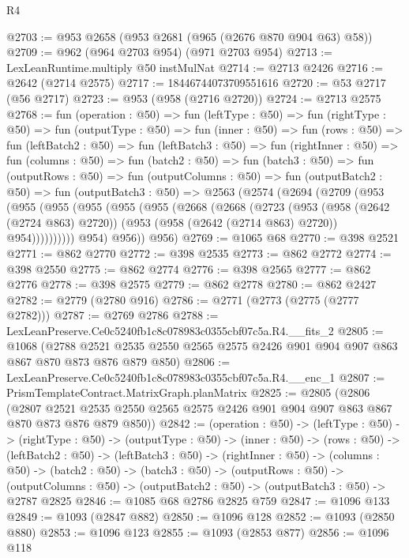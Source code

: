 \begin{lexlean}{R4}
\begin{coremodule}
@2703 := @953 @2658 (@953 @2681 (@965 (@2676 @870 @904 @63) @58))
@2709 := @962 (@964 @2703 @954) (@971 @2703 @954)
@2713 := LexLeanRuntime.multiply @50 instMulNat
@2714 := @2713 @2426
@2716 := @2642 (@2714 @2575)
@2717 := 18446744073709551616
@2720 := @53 @2717 (@56 @2717)
@2723 := @953 (@958 (@2716 @2720))
@2724 := @2713 @2575
@2768 := fun (operation : @50) =>
  fun (leftType : @50) =>
  fun (rightType : @50) =>
  fun (outputType : @50) =>
  fun (inner : @50) =>
  fun (rows : @50) =>
  fun (leftBatch2 : @50) =>
  fun (leftBatch3 : @50) =>
  fun (rightInner : @50) =>
  fun (columns : @50) =>
  fun (batch2 : @50) =>
  fun (batch3 : @50) =>
  fun (outputRows : @50) =>
  fun (outputColumns : @50) =>
  fun (outputBatch2 : @50) =>
  fun (outputBatch3 : @50) =>
  @2563
    (@2574
      (@2694
        (@2709
          (@953
            (@955
              (@955
                (@955
                  (@955
                    (@955
                      (@2668
                        (@2668
                          (@2723
                            (@953
                              (@958 (@2642 (@2724 @863) @2720))
                              (@953 (@958 (@2642 (@2714 @863) @2720)) @954))))))))))
            @954)
          @956))
      @956)
@2769 := @1065 @68
@2770 := @398 @2521
@2771 := @862 @2770
@2772 := @398 @2535
@2773 := @862 @2772
@2774 := @398 @2550
@2775 := @862 @2774
@2776 := @398 @2565
@2777 := @862 @2776
@2778 := @398 @2575
@2779 := @862 @2778
@2780 := @862 @2427
@2782 := @2779 (@2780 @916)
@2786 := @2771 (@2773 (@2775 (@2777 @2782)))
@2787 := @2769 @2786
@2788 := LexLeanPreserve.Ce0c5240fb1c8c078983c0355cbf07c5a.R4.__fits_2
@2805 := @1068
    (@2788 @2521 @2535 @2550 @2565 @2575 @2426 @901 @904 @907 @863 @867 @870 @873 @876 @879 @850)
@2806 := LexLeanPreserve.Ce0c5240fb1c8c078983c0355cbf07c5a.R4.__enc_1
@2807 := PrismTemplateContract.MatrixGraph.planMatrix
@2825 := @2805
    (@2806
      (@2807 @2521 @2535 @2550 @2565 @2575 @2426 @901 @904 @907 @863 @867 @870 @873 @876 @879 @850))
@2842 := (operation : @50) ->
  (leftType : @50) ->
  (rightType : @50) ->
  (outputType : @50) ->
  (inner : @50) ->
  (rows : @50) ->
  (leftBatch2 : @50) ->
  (leftBatch3 : @50) ->
  (rightInner : @50) ->
  (columns : @50) ->
  (batch2 : @50) ->
  (batch3 : @50) ->
  (outputRows : @50) ->
  (outputColumns : @50) -> (outputBatch2 : @50) -> (outputBatch3 : @50) -> @2787 @2825
@2846 := @1085 @68 @2786 @2825 @759
@2847 := @1096 @133
@2849 := @1093 (@2847 @882)
@2850 := @1096 @128
@2852 := @1093 (@2850 @880)
@2853 := @1096 @123
@2855 := @1093 (@2853 @877)
@2856 := @1096 @118

\end{coremodule}
\end{lexlean}
